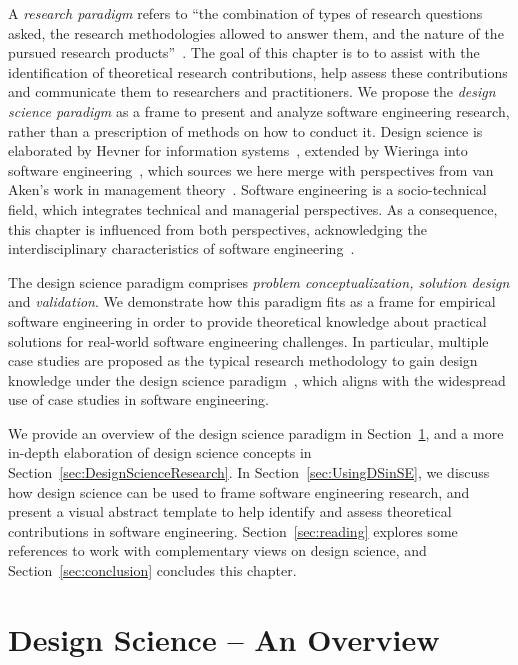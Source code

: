 \documentclass[graybox]{svmult}
\newcommand{\emelie}[1]{\textcolor{red}{{\it [Emelie says: #1]}}}
\newcommand{\per}[1]{\textcolor{cyan}{{\it [Per says: #1]}}}
\newcommand{\emelie}[1]{}
\newcommand{\per}[1]{}
\begin{document}
A \emph{research paradigm} refers to ``the combination of types of research questions asked, the research methodologies allowed to answer them, and the nature of the pursued research products''~\cite{van_aken_management_2004}. The goal of  this chapter is to  to assist with the identification of theoretical research contributions, help assess these contributions and communicate them to researchers and practitioners. 
We propose the \emph{design science paradigm} as a frame to present and analyze software engineering research, rather than a prescription of methods on how to conduct it. 
Design science is elaborated by Hevner for information systems~\cite{hevner_design_2004}, extended by Wieringa into software engineering~\cite{wieringa_what_2014}, which sources we here merge with perspectives from van Aken's work in management theory~\cite{van_aken_management_2004}. Software engineering is a socio-technical field, which integrates technical and managerial perspectives. As a consequence, this chapter is influenced from both perspectives, acknowledging the interdisciplinary characteristics of software engineering~\cite{Mendez2019}. %

The design science paradigm comprises \emph{problem conceptualization, solution design} and \emph{validation}. We demonstrate how this paradigm fits as a frame for empirical software engineering in order to provide theoretical knowledge about practical solutions for real-world software engineering challenges. In particular, multiple case studies are proposed as the typical research methodology to gain design knowledge under the design science paradigm~\cite{van_aken_management_2004}, which aligns with the widespread use of case studies in software engineering. 

We provide an overview of the design science paradigm in Section~\ref{sec:overview}, and a more in-depth elaboration of design science concepts in Section~\ref{sec:DesignScienceResearch}. In Section~\ref{sec:UsingDSinSE}, we discuss how design science can be used to frame software engineering research, and present a visual abstract template to help identify and assess theoretical contributions in software engineering. Section~\ref{sec:reading} explores some references to work with complementary views on design science, and Section~\ref{sec:conclusion} concludes this chapter.


\section{Design Science -- An Overview}
\label{sec:overview}
\end{document}
